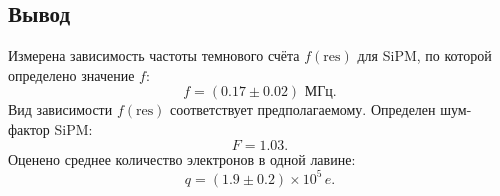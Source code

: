 \subsection*{Вывод}
 
Измерена зависимость частоты темнового счёта $f (\text{res})$ для SiPM, по которой определено значение $f$:
\begin{equation*}
    f = (0.17 \pm 0.02) \text{ МГц}.
\end{equation*}
Вид зависимости $f (\text{res})$ соответствует предполагаемому. 
Определен шум-фактор SiPM:
\begin{equation*}
    F = 1.03.
\end{equation*}
Оценено среднее количество электронов в одной лавине:
\begin{equation*}
    q = (1.9\pm 0.2)\times  10^5\, e.
\end{equation*}